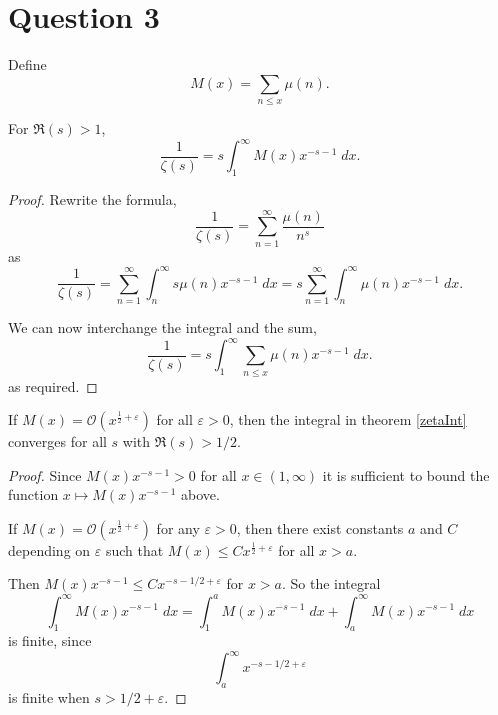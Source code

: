\documentclass{unswmaths}
\begin{document}
\section*{Question 3}
Define
\begin{equation*}
    M(x) = \sum_{n\leq x} \mu(n).
\end{equation*}
\begin{theorem} 
\label{zetaInt}
    For $\Re(s) > 1$,
    \begin{equation*}
        \frac{1}{\zeta(s)} = s\int_{1}^\infty M(x)x^{-s-1}\;dx.
    \end{equation*}
\end{theorem}
\begin{proof}
    Rewrite the formula,
    \begin{equation*}
        \frac{1}{\zeta(s)} = \sum_{n=1}^\infty \frac{\mu(n)}{n^s}
    \end{equation*}
    as
    \begin{equation*}
        \frac{1}{\zeta(s)} = \sum_{n=1}^\infty \int_{n}^\infty s\mu(n)x^{-s-1}\;dx = s\sum_{n=1}^\infty \int_{n}^\infty \mu(n)x^{-s-1}\;dx.
    \end{equation*}
    
    We can now interchange the integral and the sum, 
    \begin{equation*}
        \frac{1}{\zeta(s)} = s\int_{1}^\infty \sum_{n\leq x} \mu(n) x^{-s-1}\;dx.
    \end{equation*}
    as required.
\end{proof}
\begin{lemma}
    If $M(x) = \mathcal{O}(x^{\frac{1}{2}+\varepsilon})$ for all $\varepsilon > 0$, then
    the integral in theorem \ref{zetaInt} converges for all $s$ with $\Re(s) > 1/2$.
\end{lemma}
\begin{proof}
    Since $M(x)x^{-s-1} > 0$ for all $x \in (1,\infty)$ it is sufficient to bound the
    function $x\mapsto M(x)x^{-s-1}$ above.
    
    If $M(x) = \mathcal{O}(x^{\frac{1}{2}+\varepsilon})$ for any $\varepsilon > 0$,
    then there exist constants $a$ and $C$ depending on $\varepsilon$
    such that $M(x) \leq Cx^{\frac{1}{2}+\varepsilon}$ for all $x > a$. 
   
    Then $M(x)x^{-s-1} \leq Cx^{-s-1/2+\varepsilon}$ for $x > a$. So the integral
    \begin{equation*}
        \int_{1}^\infty M(x)x^{-s-1}\;dx = \int_{1}^a M(x)x^{-s-1}\;dx+\int_{a}^\infty M(x)x^{-s-1}\;dx
    \end{equation*}    
    is finite, since
    \begin{equation*}
        \int_{a}^\infty x^{-s-1/2+\varepsilon}
    \end{equation*}
    is finite when $s > 1/2+\varepsilon$.
\end{proof}
\end{document}
